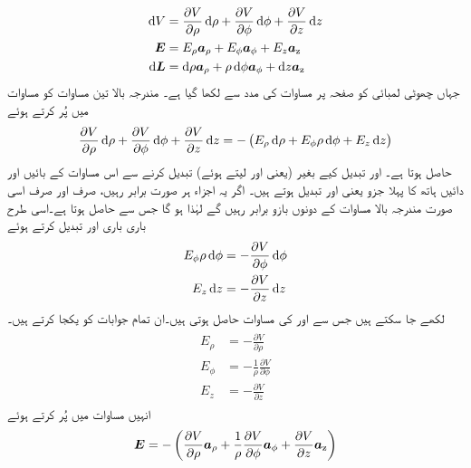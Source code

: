 \begin{align}
\dif V&=\frac{\partial V}{\partial \rho} \dif \rho+\frac{\partial V}{\partial \phi} \dif \phi +\frac{\partial V}{\partial z} \dif z \label{مساوات_توانائی_دباو_نلکی_تفرق}\\
\kvec{E}&=E_\rho \arho+ E_\phi \aphi+E_z \az \label{مساوات_توانائی_نلکی_میدان}\\
\dif \kvec{L}&=\dif \rho \arho+\rho \dif \phi \aphi+\dif z \az \label{مساوات_توانائی_نلکی_چھوٹا_فاصلہ}
\end{align}
جہاں چھوٹی لمبائی  کو صفحہ  پر مساوات  کی مدد سے لکھا گیا ہے۔
مندرجہ بالا تین مساوات کو مساوات  میں پُر کرتے ہوئے
\begin{align}
\frac{\partial V}{\partial \rho} \dif \rho+\frac{\partial V}{\partial \phi} \dif \phi +\frac{\partial V}{\partial z} \dif z=-\left(E_\rho \dif \rho+E_\phi \rho \dif \phi+E_z \dif z\right)
\end{align}
حاصل ہوتا ہے۔ اور  تبدیل کیے بغیر (یعنی  اور  لیتے ہوئے)  تبدیل کرنے سے  اس مساوات کے بائیں اور دائیں ہاتھ کا پہلا جزو یعنی  اور   تبدیل ہوتے ہیں۔ اگر یہ اجزاء ہر صورت برابر رہیں، صرف اور صرف اسی صورت مندرجہ بالا مساوات کے دونوں بازو برابر رہیں گے لہٰذا  ہو گا جس سے  حاصل ہوتا ہے۔اسی طرح باری باری  اور  تبدیل کرتے ہوئے
\begin{align*}
E_\phi \rho \dif \phi&=-\frac{\partial V}{\partial \phi} \dif \phi\\
E_z \dif z&=-\frac{\partial V}{\partial z} \dif z
\end{align*}
لکھے جا سکتے ہیں جس سے  اور  کی مساوات حاصل ہوتی ہیں۔ان تمام جوابات کو یکجا کرتے ہیں۔
\begin{gather}
\begin{aligned}
E_\rho&=-\frac{\partial V}{\partial \rho}\\
E_\phi &=-\frac{1}{\rho}\frac{\partial V}{\partial \phi} \\
E_z &=-\frac{\partial V}{\partial z} 
\end{aligned}
\end{gather}
انہیں مساوات  میں پُر کرتے ہوئے
\begin{align}
{\ensuremath{{\boldsymbol{E}}}}=-\left( \frac{\partial V}{\partial \rho} {\boldsymbol{a}}_{\rho}+\frac{1}{\rho}\frac{\partial V}{\partial \phi}  {\boldsymbol{a}}_{\phi}+\frac{\partial V}{\partial z}{\boldsymbol{a}}_{\textup{z}} \right)
\end{align}
